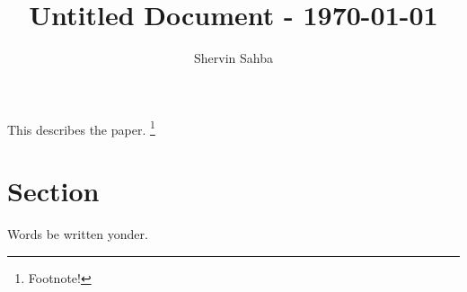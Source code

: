 \documentclass{shervin} %
\begin{document}
\title{Untitled Document - \today}
\author{Shervin Sahba\authormark{}}
\address{\authormark{}University of Washington}

\begin{abstract*}
This describes the paper. \footnote{Footnote!}
\end{abstract*}



\section{Section} \label{sec: }

Words be written yonder.\cite{DUMMYEXAMPLE}

%		







\bigskip
\printbibliography \label{sec: References}
\end{document}

